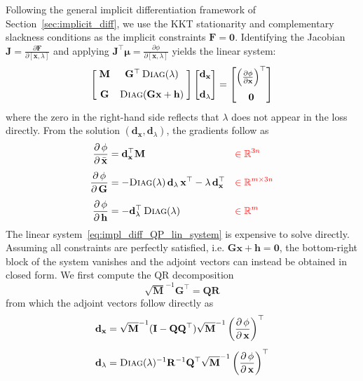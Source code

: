 \documentclass{article}
\newcommand{\pd}[2]{\dfrac{\partial\, #1}{\partial\, #2}}
\newcommand{\pdc}[2]{\frac{\partial #1}{\partial #2}}
\newcommand{\red}[1]{\textcolor{red}{#1}}
\begin{document}
\noindent Following the general implicit differentiation framework of Section~\ref{sec:implicit_diff}, we use the KKT stationarity and complementary slackness conditions as the implicit constraints $\mathbf{F} = \mathbf{0}$. Identifying the Jacobian $\mathbf{J} = \pdc{\mathbf{F}}{[\mathbf{x}, \lambda]}$ and applying $\mathbf{J}^\top\boldsymbol{\mu} = \pdc{\phi}{[\mathbf{x}, \lambda]}$ yields the linear system:
\begin{equation}
\label{eq:impl_diff_QP_lin_system}
    \begin{bmatrix}
        \;\mathbf{M} & \mathbf{G}^\top\, \textsc{Diag}(\lambda)\;\\[2ex]
        \;\mathbf{G} & \textsc{Diag}(\mathbf{G}\mathbf{x}+\mathbf{h})\;
    \end{bmatrix}
    \begin{bmatrix}
        \mathbf{d}_\mathbf{x} \\[2ex]
        \mathbf{d}_\lambda
    \end{bmatrix} = 
    \begin{bmatrix}
        \left(\pdc{\phi}{\mathbf{x}}\right)^\top\\[2ex]
        \mathbf{0}
    \end{bmatrix}
\end{equation}
where the zero in the right-hand side reflects that $\lambda$ does not appear in the loss directly.
From the solution $(\mathbf{d}_\mathbf{x}, \mathbf{d}_\lambda)$, the gradients follow as
\begin{align}
    \pd{\phi}{\bar{\mathbf{x}}} &= 
        \mathbf{d}_\mathbf{x}^\top\mathbf{M} 
         &&\red{\in \mathbb{R}^{3n}} \\[1ex]
    \pd{\phi}{\mathbf{G}} &= 
        -\textsc{Diag}(\lambda)\,\mathbf{d}_\lambda\,\mathbf{x}^{\top} - \lambda\,\mathbf{d}_\mathbf{x}^\top 
        &&\red{\in \mathbb{R}^{m\times 3n}} \\[1ex]
    \pd{\phi}{\mathbf{h}} &= 
        -\mathbf{d}_\lambda^\top\,\textsc{Diag}(\lambda)
        &&\red{\in \mathbb{R}^m}
\end{align}
The linear system~\ref{eq:impl_diff_QP_lin_system} is expensive to solve directly. Assuming all constraints are perfectly satisfied, i.e. $\mathbf{G}\mathbf{x}+\mathbf{h} = \mathbf{0}$, the bottom-right block of the system vanishes and the adjoint vectors can instead be obtained in closed form. We first compute the QR decomposition
\begin{equation}
    \sqrt{\mathbf{M}}^{-1}\mathbf{G}^\top = \mathbf{Q}\mathbf{R}
\end{equation}
from which the adjoint vectors follow directly as
\begin{align}
\mathbf{d}_\mathbf{x} &= 
    \sqrt{\mathbf{M}}^{-1}(\mathbf{I} - 
    \mathbf{Q}\mathbf{Q}^\top)\sqrt{\mathbf{M}}^{-1}
    \left(\pd{\phi}{\mathbf{x}}\right)^\top
\\[1ex]
\mathbf{d}_\lambda &=
    \textsc{Diag}(\lambda)^{-1}\mathbf{R}^{-1}\mathbf{Q}^\top\sqrt{\mathbf{M}}^{-1}\left(\pd{\phi}{\mathbf{x}}\right)^\top
\end{align}
\end{document}

